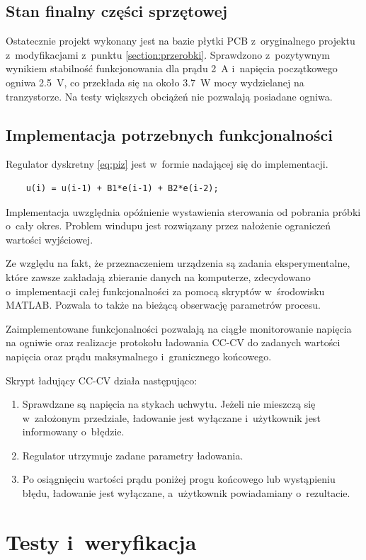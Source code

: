 \documentclass[polish,engineer]{polsl-msth}
\begin{document}
\section{Stan finalny części sprzętowej}
Ostatecznie projekt wykonany jest na bazie płytki PCB z~oryginalnego projektu z~modyfikacjami z~punktu \ref{section:przerobki}. Sprawdzono z~pozytywnym wynikiem stabilność funkcjonowania dla prądu 2~A i~napięcia początkowego ogniwa 2.5~V, co przekłada się na około 3.7~W mocy wydzielanej na tranzystorze. Na testy większych obciążeń nie pozwalają posiadane ogniwa.

\section{Implementacja potrzebnych funkcjonalności}
Regulator dyskretny \ref{eq:piz} jest w~formie nadającej się do implementacji.
\begin{verbatim}
    u(i) = u(i-1) + B1*e(i-1) + B2*e(i-2);
\end{verbatim}
Implementacja uwzględnia opóźnienie wystawienia sterowania od pobrania próbki o~cały okres.
Problem windupu jest rozwiązany przez nałożenie ograniczeń wartości wyjściowej.

Ze względu na fakt, że przeznaczeniem urządzenia są zadania eksperymentalne, które zawsze zakładają zbieranie danych na komputerze, zdecydowano o~implementacji całej funkcjonalności za pomocą skryptów w~środowisku MATLAB. Pozwala to także na bieżącą obserwację parametrów procesu.

Zaimplementowane funkcjonalności pozwalają na ciągłe monitorowanie napięcia na ogniwie oraz realizacje protokołu ładowania CC-CV do zadanych wartości napięcia oraz prądu maksymalnego i~granicznego końcowego.

Skrypt ładujący CC-CV działa następująco:
\begin{enumerate}
    \item Sprawdzane są napięcia na stykach uchwytu. Jeżeli nie mieszczą się w~założonym przedziale, ładowanie jest wyłączane i~użytkownik jest informowany o~błędzie.
    \item Regulator utrzymuje zadane parametry ładowania.
    \item Po osiągnięciu wartości prądu poniżej progu końcowego lub wystąpieniu błędu, ładowanie jest wyłączane, a~użytkownik powiadamiany o~rezultacie.
\end{enumerate}


\chapter{Testy i~weryfikacja}
\end{document}
